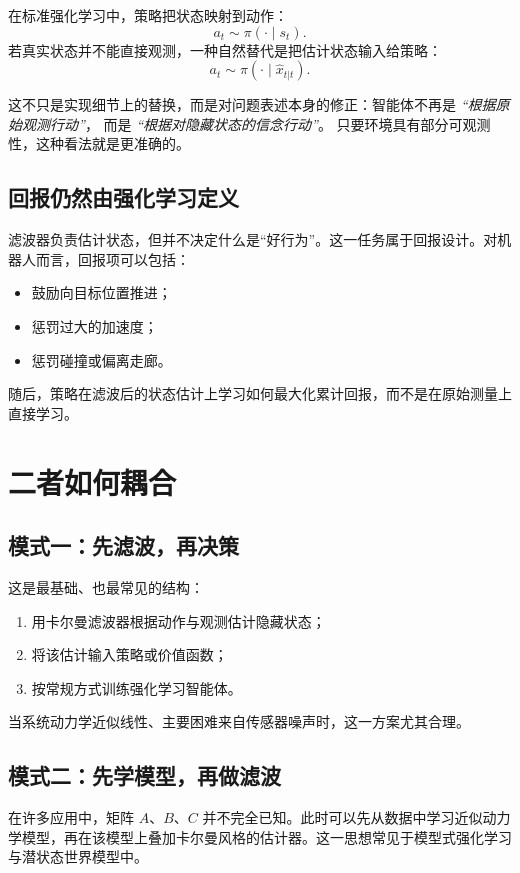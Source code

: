 \documentclass[12pt,a4paper]{ctexart}
\begin{document}
在标准强化学习中，策略把状态映射到动作：
\[
a_t \sim \pi(\cdot \mid s_t).
\]
若真实状态并不能直接观测，一种自然替代是把估计状态输入给策略：
\[
a_t \sim \pi(\cdot \mid \hat{x}_{t|t}).
\]

这不只是实现细节上的替换，而是对问题表述本身的修正：智能体不再是
\emph{“根据原始观测行动”}，
而是
\emph{“根据对隐藏状态的信念行动”}。
只要环境具有部分可观测性，这种看法就是更准确的。

\subsection{回报仍然由强化学习定义}

滤波器负责估计状态，但并不决定什么是“好行为”。这一任务属于回报设计。对机器人而言，回报项可以包括：
\begin{itemize}
  \item 鼓励向目标位置推进；
  \item 惩罚过大的加速度；
  \item 惩罚碰撞或偏离走廊。
\end{itemize}

随后，策略在滤波后的状态估计上学习如何最大化累计回报，而不是在原始测量上直接学习。

\section{二者如何耦合}

\subsection{模式一：先滤波，再决策}

这是最基础、也最常见的结构：

\begin{enumerate}
  \item 用卡尔曼滤波器根据动作与观测估计隐藏状态；
  \item 将该估计输入策略或价值函数；
  \item 按常规方式训练强化学习智能体。
\end{enumerate}

当系统动力学近似线性、主要困难来自传感器噪声时，这一方案尤其合理。

\subsection{模式二：先学模型，再做滤波}

在许多应用中，矩阵 \(A\)、\(B\)、\(C\) 并不完全已知。此时可以先从数据中学习近似动力学模型，再在该模型上叠加卡尔曼风格的估计器。这一思想常见于模型式强化学习与潜状态世界模型中。
\end{document}
